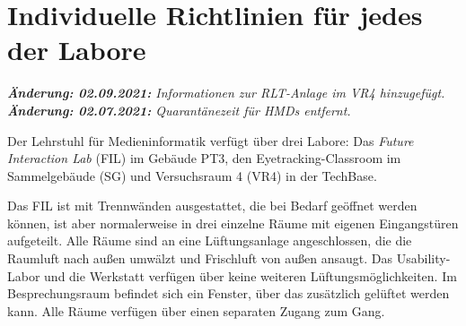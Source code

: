 \section{Individuelle Richtlinien für jedes der Labore}\label{sec:labore}
\emph{\textbf{Änderung: 02.09.2021:} Informationen zur RLT-Anlage im VR4 hinzugefügt.}
\noindent
\emph{\textbf{Änderung: 02.07.2021:} Quarantänezeit für HMDs entfernt.}

Der Lehrstuhl für Medieninformatik verfügt über drei Labore: Das \emph{Future Interaction Lab} (FIL) im Gebäude PT3, den Eyetracking-Classroom im Sammelgebäude (SG) und Versuchsraum 4 (VR4) in der TechBase.

\medskip
\begin{figure}[h]
    \sffamily
    \centering
\end{figure}

\noindent
Das FIL ist mit Trennwänden ausgestattet, die bei Bedarf geöffnet werden können, ist aber normalerweise in drei einzelne Räume mit eigenen Eingangstüren aufgeteilt.
Alle Räume sind an eine Lüftungsanlage angeschlossen, die die Raumluft nach außen umwälzt und Frischluft von außen ansaugt.
Das Usability-Labor und die Werkstatt verfügen über keine weiteren Lüftungsmöglichkeiten.
Im Besprechungsraum befindet sich ein Fenster, über das zusätzlich gelüftet werden kann.
Alle Räume verfügen über einen separaten Zugang zum Gang. 

